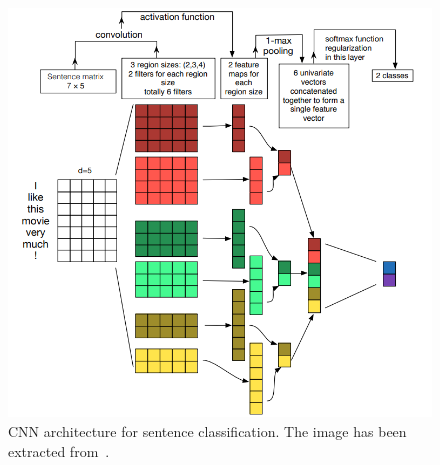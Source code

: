 







\begin{figure}[h]
\centering
 \includegraphics[width=\linewidth]{Figures/fig_cnn_for_text_cat.png}
 \caption{CNN architecture for sentence classification. The image has been extracted from\protect~\cite{DBLP:conf/ijcnlp/ZhangW17}.}
 \label{fig:cnn_text_cat}
\end{figure}

